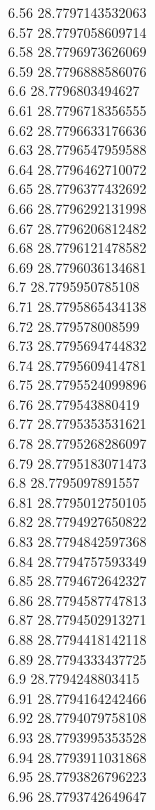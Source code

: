 {6.56	28.7797143532063\\
6.57	28.7797058609714\\
6.58	28.7796973626069\\
6.59	28.7796888586076\\
6.6	28.7796803494627\\
6.61	28.7796718356555\\
6.62	28.7796633176636\\
6.63	28.7796547959588\\
6.64	28.7796462710072\\
6.65	28.7796377432692\\
6.66	28.7796292131998\\
6.67	28.7796206812482\\
6.68	28.7796121478582\\
6.69	28.7796036134681\\
6.7	28.7795950785108\\
6.71	28.7795865434138\\
6.72	28.779578008599\\
6.73	28.7795694744832\\
6.74	28.7795609414781\\
6.75	28.7795524099896\\
6.76	28.779543880419\\
6.77	28.7795353531621\\
6.78	28.7795268286097\\
6.79	28.7795183071473\\
6.8	28.7795097891557\\
6.81	28.7795012750105\\
6.82	28.7794927650822\\
6.83	28.7794842597368\\
6.84	28.7794757593349\\
6.85	28.7794672642327\\
6.86	28.7794587747813\\
6.87	28.7794502913271\\
6.88	28.7794418142118\\
6.89	28.7794333437725\\
6.9	28.7794248803415\\
6.91	28.7794164242466\\
6.92	28.7794079758108\\
6.93	28.7793995353528\\
6.94	28.7793911031868\\
6.95	28.7793826796223\\
6.96	28.7793742649647\\
}
